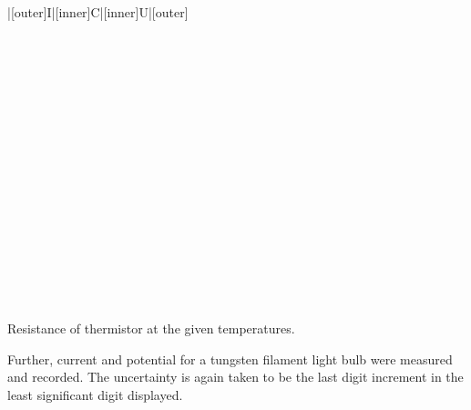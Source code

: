 \begin{paper}
{\begin{papertable}{|[outer]I|[inner]C|[inner]U|[outer]}
			\papertableindex{}\\\paperiline
			\papertableindex{}\\\paperiline
			\papertableindex{}\\\paperiline
			\papertableindex{}\\\paperiline
			\papertableindex{}\\\paperiline
			\papertableindex{}\\\paperiline
			\papertableindex{}\\\paperiline
			\papertableindex{}\\\paperiline
			\papertableindex{}\\\paperiline
			\papertableindex{}\\\paperiline
			\papertableindex{}\\\paperiline
			\papertableindex{}\\\paperiline
			\papertableindex{}\\\paperiline
			\papertableindex{}\\\paperiline
			\papertableindex{}\\\paperiline
			\papertableindex{}\\\paperiline
			\papertableindex{}\\\paperoline
		\end{papertable}\vspace{-1.5em}}
	{Resistance of thermistor at the given temperatures.}\vspace{1em}

	Further, current and potential for a tungsten filament light bulb were measured and recorded. The uncertainty is again taken to be the last digit increment in the least significant digit displayed. 


\end{paper}
